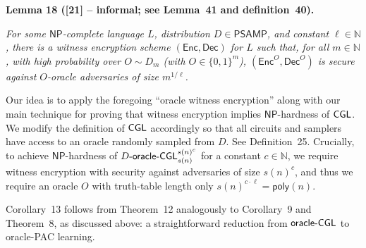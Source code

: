 \documentclass[10pt,a4paper]{article}
\begin{document}
\par\medskip\noindent\textbf{
\textbf{Lemma 18}\textbf{ }([21] – informal; see Lemma 41 and definition 40)\textbf{.}
}\par



\emph{For some ${\mathsf{NP}}$-complete language $L$, distribution $D\in{\mathsf{P}}{\mathsf{SAMP}}$, and constant $\ell\in\mathbb{N}$, there is a witness encryption scheme $({\mathsf{Enc}},{\mathsf{Dec}})$ for $L$ such that, for all $m\in\mathbb{N}$, with high probability over $O\sim D_{m}$ (with $O\in\{0,1\}^{m}$), $({\mathsf{Enc}}^{O},{\mathsf{Dec}}^{O})$ is secure against $O$-oracle adversaries of size $m^{1/\ell}$.}\par






Our idea is to apply the foregoing “oracle witness encryption” along with our main technique for proving that witness encryption implies ${\mathsf{NP}}$-hardness of ${\sf CGL}$. We modify the definition of ${\sf CGL}$ accordingly so that all circuits and samplers have access to an oracle randomly sampled from $D$. See Definition 25. Crucially, to achieve ${\mathsf{NP}}$-hardness of $D\text{-}{\sf oracle}\text{-}{\sf CGL}_{s(n)}^{s(n)^{c}}$ for a constant $c\in\mathbb{N}$, we require witness encryption with security against adversaries of size $s(n)^{c}$, and thus we require an oracle $O$ with truth-table length only $s(n)^{c\cdot\ell}={\mathsf{poly}}(n)$.\par




Corollary 13 follows from Theorem 12 analogously to Corollary 9 and Theorem 8, as discussed above: a straightforward reduction from ${\sf oracle}\text{-}{\sf CGL}$ to oracle-PAC learning.\par
\end{document}

